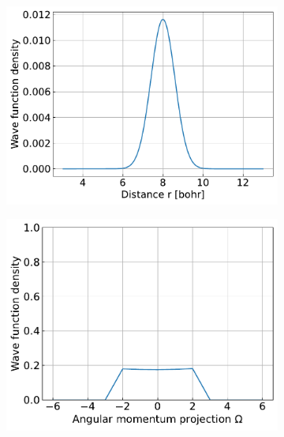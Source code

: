 \documentclass{article}
\begin{document}
    \begin{figure}[H]
        \centering
        \begin{subfigure}{.4\linewidth}
            \centering
            \includegraphics[width=\linewidth]{harmonic_iso_coriolis_distance.pdf}
        \end{subfigure}
        \begin{subfigure}{.4\linewidth}
            \centering
            \includegraphics[width=\linewidth]{harmonic_iso_coriolis_omega.pdf}
        \end{subfigure}     
        \begin{subfigure}{.4\linewidth}
            \centering

\end{subfigure}
\end{figure}
\end{document}

